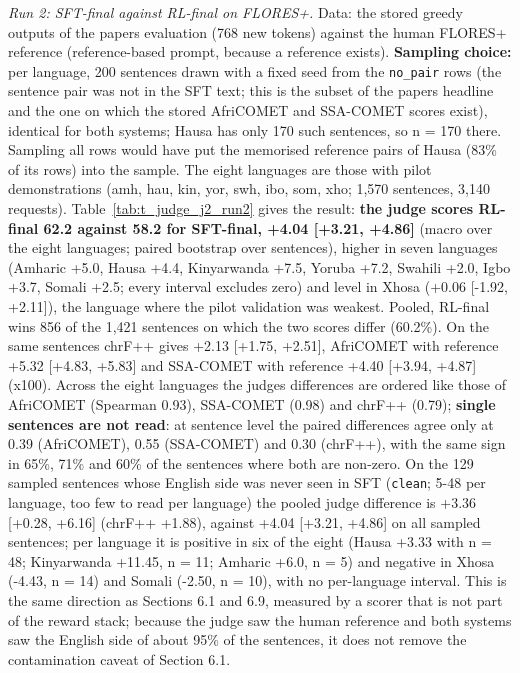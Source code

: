 \emph{Run 2: SFT-final against RL-final on FLORES+.} Data: the stored greedy outputs of the paper\textquotesingle s evaluation (768 new tokens) against the human FLORES+ reference (reference-based prompt, because a reference exists). \textbf{Sampling choice:} per language, 200 sentences drawn with a fixed seed from the \texttt{no\_pair} rows (the sentence pair was not in the SFT text; this is the subset of the paper\textquotesingle s headline and the one on which the stored AfriCOMET and SSA-COMET scores exist), identical for both systems; Hausa has only 170 such sentences, so n = 170 there. Sampling all rows would have put the memorised reference pairs of Hausa (83\% of its rows) into the sample. The eight languages are those with pilot demonstrations (amh, hau, kin, yor, swh, ibo, som, xho; 1,570 sentences, 3,140 requests). Table~\ref{tab:t_judge_j2_run2} gives the result: \textbf{the judge scores RL-final 62.2 against 58.2 for SFT-final, +4.04 {[}+3.21, +4.86{]}} (macro over the eight languages; paired bootstrap over sentences), higher in seven languages (Amharic +5.0, Hausa +4.4, Kinyarwanda +7.5, Yoruba +7.2, Swahili +2.0, Igbo +3.7, Somali +2.5; every interval excludes zero) and level in Xhosa (+0.06 {[}-1.92, +2.11{]}), the language where the pilot validation was weakest. Pooled, RL-final wins 856 of the 1,421 sentences on which the two scores differ (60.2\%). On the same sentences chrF++ gives +2.13 {[}+1.75, +2.51{]}, AfriCOMET with reference +5.32 {[}+4.83, +5.83{]} and SSA-COMET with reference +4.40 {[}+3.94, +4.87{]} (x100). Across the eight languages the judge\textquotesingle s differences are ordered like those of AfriCOMET (Spearman 0.93), SSA-COMET (0.98) and chrF++ (0.79); \textbf{single sentences are not read}: at sentence level the paired differences agree only at 0.39 (AfriCOMET), 0.55 (SSA-COMET) and 0.30 (chrF++), with the same sign in 65\%, 71\% and 60\% of the sentences where both are non-zero. On the 129 sampled sentences whose English side was never seen in SFT (\texttt{clean}; 5-48 per language, too few to read per language) the pooled judge difference is +3.36 {[}+0.28, +6.16{]} (chrF++ +1.88), against +4.04 {[}+3.21, +4.86{]} on all sampled sentences; per language it is positive in six of the eight (Hausa +3.33 with n = 48; Kinyarwanda +11.45, n = 11; Amharic +6.0, n = 5) and negative in Xhosa (-4.43, n = 14) and Somali (-2.50, n = 10), with no per-language interval. This is the same direction as Sections 6.1 and 6.9, measured by a scorer that is not part of the reward stack; because the judge saw the human reference and both systems saw the English side of about 95\% of the sentences, it does not remove the contamination caveat of Section 6.1.

